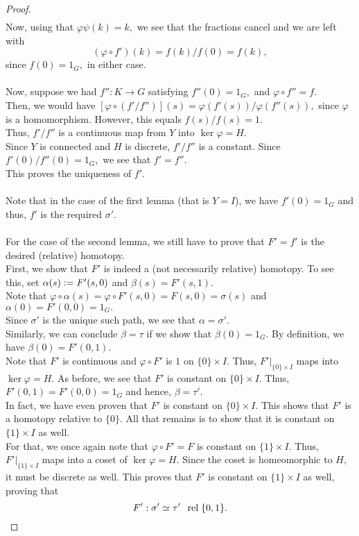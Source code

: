 \documentclass[12pt]{article}
\theoremstyle{definition}
\numberwithin{thm}{section}
\newcommand{\rel}{\;\;\operatorname{rel}\;}
\begin{document}
\begin{proof}
\begin{align*}
 	\end{align*}
 	Now, using that $\varphi\psi(k) = k,$ we see that the fractions cancel and we are left with
 	\begin{equation*} 
 		(\varphi\circ f')(k) = f(k)/f(0) = f(k),
 	\end{equation*}
 	since $f(0) = 1_G,$ in either case.\\~\\
 	Now, suppose we had $f'': K \to G$ satisfying $f''(0) = 1_G,$ and $\varphi\circ f'' = f.$\\
 	Then, we would have $[\varphi\circ(f'/f'')](s) = \varphi(f'(s))/\varphi(f''(s)),$ since $\varphi$ is a homomorphism. However, this equals $f(s)/f(s) = 1.$\\
 	Thus, $f'/f''$ is a continuous map from $Y$ into $\ker\varphi = H.$\\
 	Since $Y$ is connected and $H$ is discrete, $f'/f''$ is a constant. Since $f'(0)/f''(0) = 1_G,$ we see that $f' = f''.$\\
 	This proves the uniqueness of $f'.$\\~\\
 	Note that in the case of the first lemma (that is $Y = I$), we have $f'(0) = 1_G$ and thus, $f'$ is the required $\sigma'.$\\~\\
 	For the case of the second lemma, we still have to prove that $F' = f'$ is the desired (relative) homotopy.\\
 	First, we show that $F'$ is indeed a (not necessarily relative) homotopy. To see this, set $\alpha(s) \vcentcolon= F'(s, 0)$ and $\beta(s) = F'(s, 1).$\\
 	Note that $\varphi\circ \alpha(s) = \varphi \circ F'(s, 0) = F(s, 0) = \sigma(s)$ and $\alpha(0) = F'(0, 0) = 1_G.$ \\
 	Since $\sigma'$ is the unique such path, we see that $\alpha = \sigma'.$\\
 	Similarly, we can conclude $\beta = \tau$ if we show that $\beta(0) = 1_G.$ By definition, we have $\beta(0) = F'(0, 1).$ \\
 	Note that $F'$ is continuous and $\varphi \circ F'$ is $1$ on $\{0\} \times I.$ Thus, $F'|_{\{0\} \times I}$ maps into $\ker \varphi = H.$ As before, we see that $F'$ is constant on $\{0\} \times I.$ Thus, $F'(0, 1) = F'(0, 0) = 1_G$ and hence, $\beta = \tau'.$\\
 	In fact, we have even proven that $F'$ is constant on $\{0\} \times I.$ This shows that $F'$ is a homotopy relative to $\{0\}.$ All that remains is to show that it is constant on $\{1\} \times I$ as well.\\
 	For that, we once again note that $\varphi\circ F' = F$ is constant on $\{1\}\times I.$ Thus, $F'|_{\{1\}\times I}$ maps into a coset of $\ker \varphi = H.$ Since the coset is homeomorphic to $H,$ it must be discrete as well. This proves that $F'$ is constant on $\{1\} \times I$ as well, proving that
 	\begin{equation*} 
 		F' : \sigma' \simeq \tau' \rel \{0, 1\}. \qedhere
 	\end{equation*}
 \end{proof} 
\end{document}
